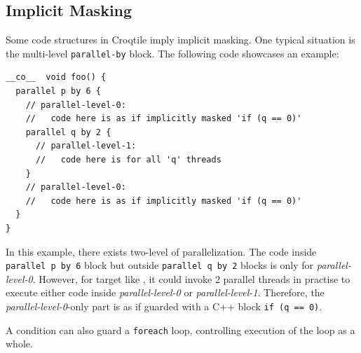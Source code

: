 \subsection*{Implicit Masking}

Some code structures in Croqtile imply implicit masking. One typical situation is the multi-level \texttt{parallel-by} block. The following code showcases an example:

\begin{lstlisting}[language=croqtile,caption={Implicit Masking}]
__co__  void foo() {
  parallel p by 6 {
    // parallel-level-0:
    //   code here is as if implicitly masked 'if (q == 0)'
    parallel q by 2 {
      // parallel-level-1:
      //   code here is for all 'q' threads
    }
    // parallel-level-0:
    //   code here is as if implicitly masked 'if (q == 0)'
  }
}
\end{lstlisting}

In this example, there exists two-level of parallelization. The code inside \texttt{parallel p by 6} block but outside \texttt{parallel q by 2} blocks is only for \emph{parallel-level-0}. However, for target like , it could invoke 2 parallel threads in practise to execute either code inside \emph{parallel-level-0} or \emph{parallel-level-1}. Therefore, the \emph{parallel-level-0}-only part is as if guarded with a C++ block \texttt{if (q == 0)}.

A condition can also guard a \texttt{foreach} loop, controlling execution of the loop as a whole.
